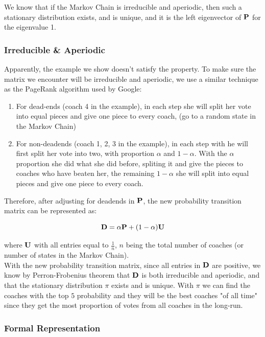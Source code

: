 \documentclass[titlepage]{article}
\begin{document}
\noindent We know that if the Markov Chain is irreducible and aperiodic, then such a stationary distribution exists, and is unique, and it is the left eigenvector of $\bf{P}$ for the eigenvalue 1.


\subsubsection*{Irreducible \& Aperiodic}

\noindent Apparently, the example we show doesn't satisfy the property. To make sure the matrix we encounter will be irreducible and aperiodic, we use a similar technique as the PageRank algorithm used by Google:

\begin{enumerate}
\item For dead-ends (coach 4 in the example), in each step she will split her vote into equal pieces and give one piece to every coach, (go to a random state in the Markov Chain)
\item For non-deadends (coach 1, 2, 3 in the example), in each step with he will first split her vote into two, with proportion $\alpha$ and $1 - \alpha$. With the $\alpha$ proportion she did what she did before, spliting it and give the pieces to coaches who have beaten her, the remaining $1 - \alpha$ she will split into equal pieces and give one piece to every coach.
\end{enumerate}

\noindent Therefore, after adjusting for deadends in ${\bf P}$, the new probability transition matrix can be represented as:

$${\bf D} = \alpha {\bf P} + (1 - \alpha) {\bf U}$$

\noindent where $\bf{U}$ with all entries equal to $\frac{1}{n}$, $n$ being the total number of coaches (or number of states in the Markov Chain).
\\

\noindent With the new probability transition matrix, since all entries in $\bf{D}$ are positive, we know by Perron-Frobenius theorem that $\bf{D}$ is both irreducible and aperiodic, and that the stationary distribution $\pi$ exists and is unique. With $\pi$ we can find the coaches with the top $5$ probability and they will be the best coaches "of all time" since they get the most proportion of votes from all coaches in the long-run.

\subsubsection*{Formal Representation}
\end{document}

